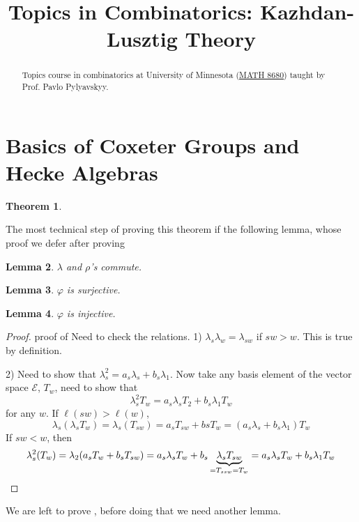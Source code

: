 \documentclass[12pt]{amsart}
\title{Topics in Combinatorics: Kazhdan-Lusztig Theory}
\numberwithin{equation}{section}
\theoremstyle{plain}
\newtheorem{theorem}{Theorem}[section]
\newtheorem{lemma}[theorem]{Lemma}
\theoremstyle{definition}
\begin{document}
\maketitle
\begin{abstract}
	Topics course in combinatorics at University of Minnesota (\href{https://sites.google.com/view/8680spring2023/home}{MATH 8680}) taught by Prof. Pavlo Pylyavskyy.
\end{abstract}
\setcounter{tocdepth}{1}
\tableofcontents
\setlength{\parindent}{0em}
\setlength{\parskip}{0.618em}

\tableofcontents




\section{Basics of Coxeter Groups and Hecke Algebras}
\begin{theorem}\label{thm:Hecke}
	
\end{theorem}
The most technical step of proving this theorem if the following lemma, whose proof we defer after proving 
\begin{lemma}\label{lem:lam_rho_commute}
	$\lambda$ and $\rho$'s commute.
\end{lemma}

\begin{lemma}
	$\varphi$ is surjective.
\end{lemma}
\begin{lemma}
	$\varphi$ is injective.
\end{lemma}
\begin{proof}{proof of }
	Need to check the relations.
	1) $\lambda_s\lambda_w=\lambda_{sw}$ if $sw>w$. This is true by definition.
	
	2) Need to show that $\lambda_s^2 = a_s \lambda_s+b_s\lambda_1$. Now take any basis element of the vector space $\mathcal{E}$, $T_w$, need to show that
	\[\lambda_s^2T_w = a_s\lambda_s T_2 + b_s\lambda_1 T_w\]
	for any $w$.
	If $\ell(sw)>\ell(w)$,
	\[\lambda_s(\lambda_s T_w)=\lambda_s(T_{sw})=a_sT_{sw}+bs T_w=(a_s\lambda_s+b_s\lambda_1)T_w\]
	If $sw<w$, then
	\[\lambda_s^2(T_w)=\lambda_2(a_sT_w+b_sT_{sw})=a_s\lambda_s T_w+b_s\underbrace{\lambda_s T_{sw}}_{=T_{ssw}=T_w}=a_s\lambda_sT_w+b_s\lambda_1 T_w\qedhere\]
\end{proof}
We are left to prove , before doing that we need another lemma.
\end{document}

